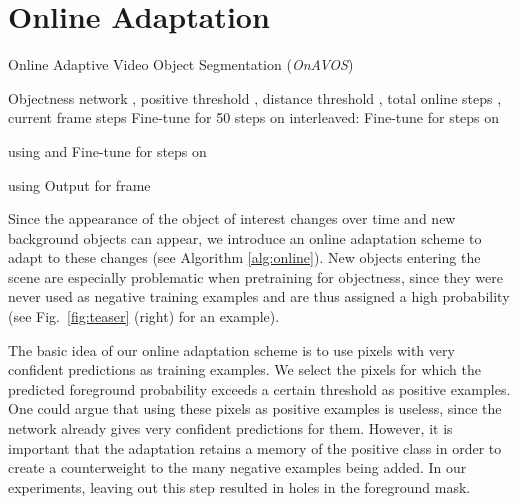 \documentclass{bmvc2k}
\newcommand{\methodname}[1]{\mbox{\emph{#1}}}
\begin{document}
\section{Online Adaptation}
\label{sec:online}



\begin{algorithm}[t]
\renewcommand{\algorithmicrequire}{\textbf{Input:}}
\renewcommand{\algorithmicensure}{\textbf{Output:}}
\footnotesize
\caption{\label{alg:online}Online Adaptive Video Object Segmentation (\methodname{OnAVOS})}
\begin{multicols}{2}
\begin{algorithmic}[1]
\Require Objectness network , positive threshold , distance threshold , total online steps , current frame steps 
\State Fine-tune  for 50 steps on 
\State 
\For{}
  \State 
  \State 
  \State 
  \State 
  \State 
  \vfill\null
  \If{}
    \State interleaved:
    \State \quad Fine-tune  for  steps on  \par
      \qquad \quad using  and 
    \State \quad Fine-tune  for  steps on \par
      \qquad \quad  using 
  \EndIf
  \State 
  \State 
  \State Output  for frame 
\EndFor
\end{algorithmic}
\end{multicols}
\vspace{-0.5cm}
\end{algorithm}

Since the appearance of the object of interest changes over time and new background objects can appear, we introduce an online adaptation scheme to adapt to these changes (see Algorithm \ref{alg:online}). New objects entering the scene are especially problematic when pretraining for objectness, since they were never used as negative training examples and are thus assigned a high probability (see Fig.~\ref{fig:teaser} (right) for an example).

The basic idea of our online adaptation scheme is to use pixels with very confident predictions as training examples. We select the pixels for which the predicted foreground probability exceeds a certain threshold  as positive examples. One could argue that using these pixels as positive examples is useless, since the network already gives very confident predictions for them. However, it is important that the adaptation retains a memory of the positive class in order to create a counterweight to the many negative examples being added. In our experiments, leaving out this step resulted in holes in the foreground mask.
\end{document}
